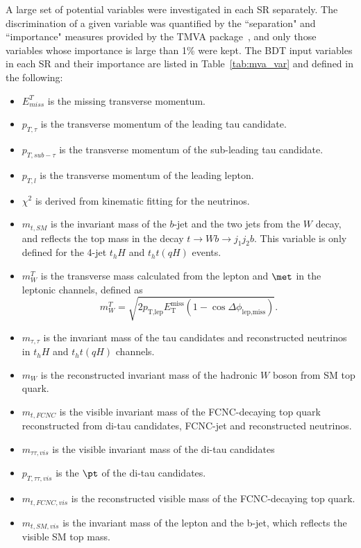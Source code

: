 A large set of potential variables were investigated in each SR separately. The discrimination of a given variable was quantified by the ``separation" and ``importance" measures provided by the TMVA package~\cite{Hocker:2007ht}, and only those variables whose importance is large than 1\% were kept.
The BDT input variables in each SR and their importance are listed in Table~\ref{tab:mva_var} and defined in the following:
\begin{itemize}
\item $E^{T}_{miss}$ is the missing transverse momentum.
\item $p_{T,\tau}$ is the transverse momentum of the leading tau candidate.
\item $p_{T,sub-\tau}$ is the transverse momentum of the sub-leading tau candidate.
\item $p_{T,l}$ is the transverse momentum of the leading lepton.
\item $\chi^2$ is derived from kinematic fitting for the neutrinos.
\item $m_{t,SM}$ is the invariant mass of the $b$-jet and the two jets from the $W$ decay, and reflects the top mass in the decay $t\to Wb \to j_1j_2b$. This variable is only defined for the 4-jet $t_hH$ and $t_ht(qH)$ events.
\item $m^{T}_{W}$ is the transverse mass calculated from the lepton and $\met$ in the leptonic channels, defined as
\begin{equation}
m^{T}_{W} = \sqrt{2 p_{\text{T,lep}} E_{\text{T}}^{\text{miss}} \left(1-\cos\Delta\phi_{\text{lep,miss}} \right)}.  
\end{equation}
\item $m_{\tau,\tau}$ is the invariant mass of the tau candidates and reconstructed neutrinos in $t_hH$ and $t_ht(qH)$ channels. 
\item $m_{W}$ is the reconstructed invariant mass of the hadronic $W$ boson from SM top quark.
\item $m_{t,FCNC}$ is the visible invariant mass of the FCNC-decaying top quark reconstructed from di-tau candidates, FCNC-jet and reconstructed neutrinos.
\item $m_{\tau\tau,vis}$ is the visible invariant mass of the di-tau candidates
\item $p_{T,\tau\tau,vis}$ is the $\pt$ of the di-tau candidates.
\item $m_{t,FCNC,vis}$ is the reconstructed visible mass of the FCNC-decaying top quark.
\item $m_{t,SM,vis}$ is the invariant mass of the lepton and the b-jet, which reflects the visible SM top mass.

\end{itemize}
